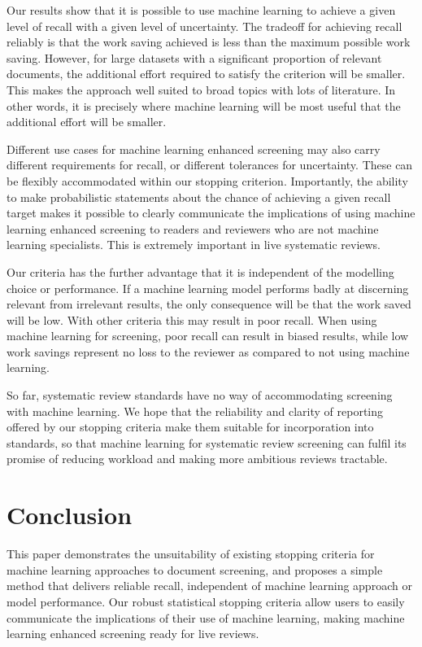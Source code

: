 \documentclass{bmcart}
\begin{document}
	Our results show that it is possible to use machine learning to achieve a given level of recall with a given level of uncertainty. The tradeoff for achieving recall reliably is that the work saving achieved is less than the maximum possible work saving. However, for large datasets with a significant proportion of relevant documents, the additional effort required to satisfy the criterion will be smaller. This makes the approach well suited to broad topics with lots of literature. In other words, it is precisely where machine learning will be most useful that the additional effort will be smaller.
	
	Different use cases for machine learning enhanced screening may also carry different requirements for recall, or different tolerances for uncertainty. These can be flexibly accommodated within our stopping criterion. Importantly, the ability to make probabilistic statements about the chance of achieving a given recall target makes it possible to clearly communicate the implications of using machine learning enhanced screening to readers and reviewers who are not machine learning specialists. This is extremely important in live systematic reviews. 
	
	Our criteria has the further advantage that it is independent of the modelling choice or performance. If a machine learning model performs badly at discerning relevant from irrelevant results, the only consequence will be that the work saved will be low. With other criteria this may result in poor recall. 
	When using machine learning for screening, poor recall can result in biased results, while low work savings represent no loss to the reviewer as compared to not using machine learning.
	
	So far, systematic review standards have no way of accommodating screening with machine learning. 
	We hope that the reliability and clarity of reporting offered by our stopping criteria make them suitable for incorporation into standards, so that machine learning for systematic review screening can fulfil its promise of reducing workload and making more ambitious reviews tractable.
	
	\section*{Conclusion}
	
	This paper demonstrates the unsuitability of existing stopping criteria for machine learning approaches to document screening, and proposes a simple method that delivers reliable recall, independent of machine learning approach or model performance. Our robust statistical stopping criteria allow users to easily communicate the implications of their use of machine learning, making machine learning enhanced screening ready for live reviews.
	
\end{document}
